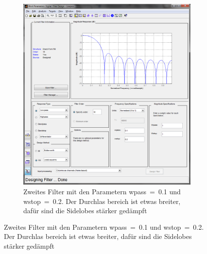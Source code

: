\begin{figure} [h]
\begin{subfigure}[t]{0.5\textwidth}
                 \includegraphics[width=\textwidth]{common/img/filter2.png}
                 \vspace{.1cm}
                 \caption{ Zweites Filter mit den Parametern wpass~=~0.1 und wstop~=~0.2. Der Durchlas bereich ist etwas breiter, dafür sind die Sidelobes stärker gedämpft }
                 \label{fig:Filter2_B}
         \end{subfigure}
%
\end{figure}
